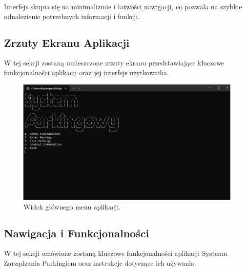 \documentclass{article}
\begin{document}
Interfejs skupia się na minimalizmie i łatwości nawigacji, co pozwala na szybkie odnalezienie potrzebnych informacji i funkcji.

\subsection{Zrzuty Ekranu Aplikacji}
W tej sekcji zostaną umieszczone zrzuty ekranu przedstawiające kluczowe funkcjonalności aplikacji oraz jej interfejs użytkownika.

\begin{figure}[H]
\centering
\includegraphics[width=\textwidth]{photos/mainmenu.png}
\caption{Widok głównego menu aplikacji.}
\end{figure}

\clearpage
\subsection{Nawigacja i Funkcjonalności}
W tej sekcji omówione zostaną kluczowe funkcjonalności aplikacji Systemu Zarządzania Parkingiem oraz instrukcje dotyczące ich używania.
\end{document}
